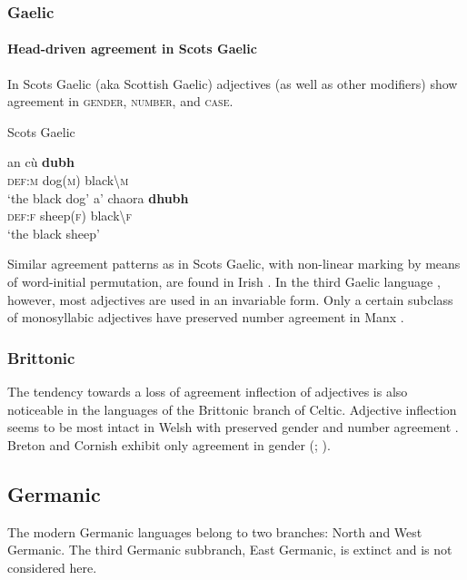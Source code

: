 \subsubsection{Gaelic}
\paragraph*{Head\hyp{}driven agreement in Scots Gaelic} 
In Scots Gaelic (aka Scottish Gaelic) adjectives (as well as other modifiers) show agreement in \textsc{gender, number}, and \textsc{case}.
\begin{exe}
\ex \rm{Scots Gaelic \citep[201]{macauley1992}}
\begin{xlist}
\ex
\gll	an cù \textbf{dubh}\\
	\textsc{def:m} dog(\textsc{m}) black\textbackslash\textsc{m}\\
\glt	‘the black dog’
\ex
\gll	a' chaora \textbf{dhubh}\\
	\textsc{def:f} sheep(\textsc{f}) black\textbackslash\textsc{f}\\
\glt	‘the black sheep’
\end{xlist}
\end{exe}
Similar agreement patterns as in Scots Gaelic, with non-linear marking by means of word-initial permutation, are found in Irish \cite[73, 97]{odochartaigh1992}. In the third Gaelic language , however, most adjectives are used in an invariable form. Only a certain subclass of monosyllabic adjectives have preserved number agreement in Manx \citep[127]{thomsen1992}.

\subsubsection{Brittonic}
The tendency towards a loss of agreement inflection of adjectives is also noticeable in the languages of the Brittonic branch of Celtic. Adjective inflection seems to be most intact in Welsh with preserved gender and number agreement \citep[298–299]{thomas1992a}. Breton and Cornish exhibit only agreement in gender (\citealt[405]{ternes1992}; \citealt[355]{thomas1992b}).

\subsection{Germanic}
The modern Germanic languages belong to two branches: North and West Germanic. The third Germanic subbranch, East Germanic, is extinct and is not considered here.

